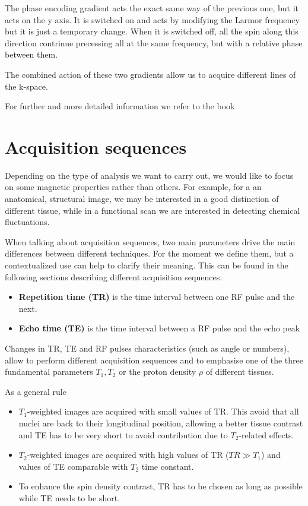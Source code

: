 \documentclass[11pt]{report}
\begin{document}
The phase encoding gradient acts the exact same way of the previous one, but it acts on the y axis. It is switched on and acts by modifying the Larmor frequency but it is just a temporary change. When it is switched off, all the spin along this direction contrinue precessing all at the same frequency, but with a relative phase between them.

The combined action of these two gradients allow us to acquire different lines of the k-space.


For further and more detailed information we refer to the book \cite{brown-2014}

\section{Acquisition sequences}
Depending on the type of analysis we want to carry out, we would like to focus on some magnetic properties rather than others.
For example, for a an anatomical, structural image, we may be interested in a good distinction of different tissue, while in a functional scan we are interested in detecting chemical fluctuations.

When talking about acquisition sequences, two main parameters drive the main differences between different techniques.
For the moment we define them, but a contextualized use can help to clarify their meaning.
This can be found in the following sections describing different acquisition sequences.

\begin{itemize}
\item \textbf{Repetition time (TR)} is the time interval between one RF pulse and the next.
\item \textbf{Echo time (TE)} is the time interval between a RF pulse and the echo peak
\end{itemize}

Changes in TR, TE and RF pulses characteristics (such as angle or numbers), allow to perform different acquisition sequences and to emphasise one of the three fundamental parameters $T_1, T_2$ or the proton density $\rho$ of different tissues.

As a general rule
\begin{itemize}
\item $T_1$-weighted images are acquired with small values of TR. This avoid that all nuclei are back to their longitudinal position, allowing a better tissue contrast and TE has to be very short to avoid contribution due to $T_2$-related effects.
\item $T_2$-weighted images are acquired with high values of TR ($TR \gg T_1$) and values of TE comparable with $T_2$ time constant.
\item To enhance the spin density contrast, TR has to be chosen as long as possible while TE needs to be short.
\end{itemize}
\end{document}

